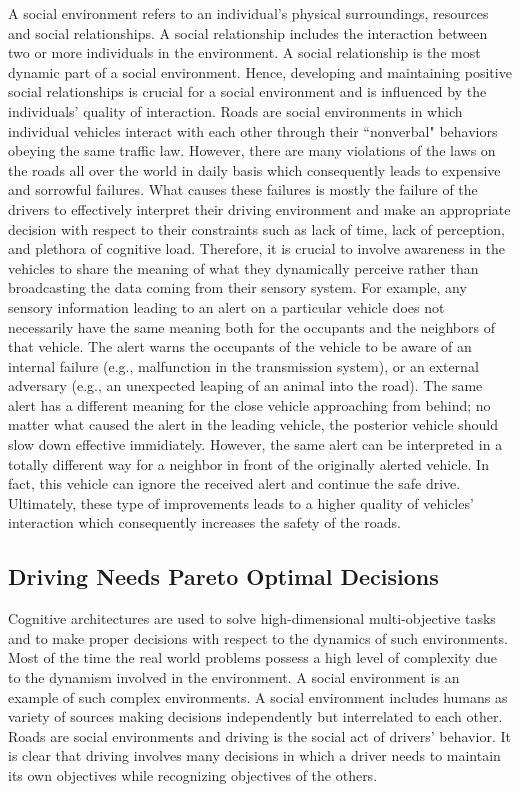 \documentclass[journal, 11pt]{IEEEtran}
\begin{document}
A social environment refers to an individual's physical surroundings, resources
and social relationships. A social relationship includes the interaction between
two or more individuals in the environment. A social relationship is the most
dynamic part of a social environment. Hence, developing and maintaining positive
social relationships is crucial for a social environment and is influenced by
the individuals' quality of interaction. Roads are social environments in which
individual vehicles interact with each other through their ``nonverbal"
behaviors obeying the same traffic law. However, there are many violations of
the laws on the roads all over the world in daily basis which consequently leads
to expensive and sorrowful failures. What causes these failures is mostly the
failure of the drivers to effectively interpret their driving environment and
make an appropriate decision with respect to their constraints such as lack of
time, lack of perception, and plethora of cognitive load. Therefore, it is
crucial to involve awareness in the vehicles to share the meaning of what they
dynamically perceive rather than broadcasting the data coming from their sensory
system. For example, any sensory information leading to an alert on a particular
vehicle does not necessarily have the same meaning both for the occupants and
the neighbors of that vehicle. The alert warns the occupants of the vehicle to
be aware of an internal failure (e.g., malfunction in the transmission system),
or an external adversary (e.g., an unexpected leaping of an animal into the
road). The same alert has a different meaning for the close vehicle approaching
from behind; no matter what caused the alert in the leading vehicle, the
posterior vehicle should slow down effective immidiately. However, the same
alert can be interpreted in a totally different way for a neighbor in front of
the originally alerted vehicle. In fact, this vehicle can ignore the received
alert and continue the safe drive. Ultimately, these type of improvements leads
to a higher quality of vehicles' interaction which consequently increases the
safety of the roads.

\subsection{Driving Needs Pareto Optimal Decisions}

Cognitive architectures are used to solve high-dimensional multi-objective
tasks and to make proper decisions with respect to the dynamics of such
environments. Most of the time the real world problems possess a high level of
complexity due to the dynamism involved in the environment. A social environment
is an example of such complex environments. A social environment includes humans
as variety of sources making decisions independently but interrelated to each
other. Roads are social environments and driving is the social act of drivers'
behavior. It is clear that driving involves many decisions in which a driver
needs to maintain its own objectives while recognizing objectives of the others.
\end{document}
